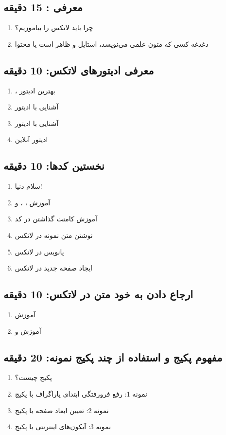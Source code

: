 \documentclass{article}
\begin{document}
\subsection*{معرفی \lr{\LaTeX}: 15 دقیقه}
\begin{enumerate}
\item چرا باید لاتکس را بیاموزیم؟
\item دغدغه کسی که متون علمی می‌نویسد، استایل و ظاهر است یا محتوا
\end{enumerate}
\subsection*{معرفی ادیتورهای لاتکس: 10 دقیقه}
\begin{enumerate}
\item {}، بهترین ادیتور
\item آشنایی با ادیتور 
\item آشنایی با ادیتور 
\item ادیتور آنلاین 
\end{enumerate}
\subsection*{نخستین کدها: 10 دقیقه}
\begin{enumerate}
\item سلام دنیا!
\item آموزش ، ،  و 
\item آموزش کامنت گذاشتن در کد
\item نوشتن متن نمونه در لاتکس
\item پانویس در لاتکس
\item ایجاد صفحه جدید در لاتکس
\end{enumerate}
\subsection*{ارجاع دادن به خود متن در لاتکس: 10 دقیقه}
\begin{enumerate}
\item آموزش 
\item آموزش  و 
\end{enumerate}
\subsection*{مفهوم پکیج و استفاده از چند پکیج نمونه: 20 دقیقه}
\begin{enumerate}
\item پکیج چیست؟
\item نمونه 1: رفع فرورفتگی ابتدای پاراگراف با پکیج 
\item نمونه 2: تعیین ابعاد صفحه با پکیج 
\item نمونه 3: آیکون‌های اینترنتی با پکیج 
\end{enumerate}
\end{document}
